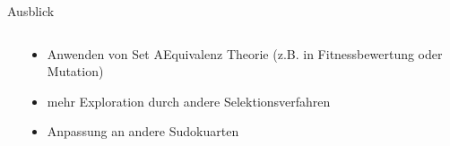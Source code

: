 \begin{frame}{Ausblick}
\begin{columns}[T]
\begin{column}{0.3\textwidth}
            \cite{SET}
        \end{column}
        \begin{column}{0.35\textwidth}
            \vspace*{0.5cm}
            \begin{itemize}
                \item Anwenden von Set AEquivalenz Theorie (z.B. in Fitnessbewertung oder Mutation)
                \item mehr Exploration durch andere Selektionsverfahren
                \item Anpassung an andere Sudokuarten
            \end{itemize}
        \end{column}
    \end{columns}
\end{frame}